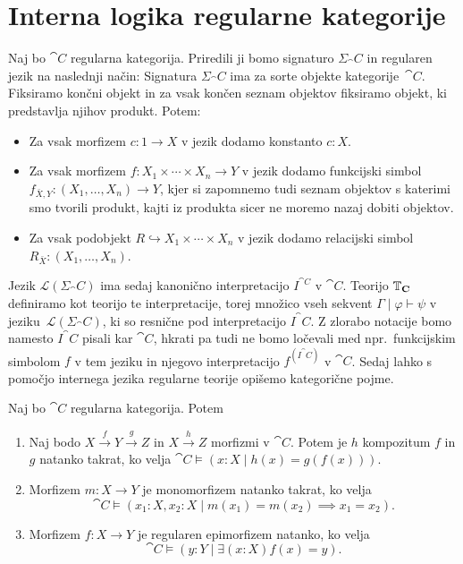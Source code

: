 \documentclass[../kategoricna_logika.tex]{subfiles}
\begin{document}
\section{Interna logika regularne kategorije}
Naj bo $\cat{C}$ regularna kategorija.  Priredili ji bomo signaturo
$\Sigma_\cat{C}$ in regularen jezik na naslednji način: Signatura
$\Sigma_\cat{C}$ ima za sorte objekte kategorije~$\cat{C}$.
Fiksiramo končni objekt in za vsak končen seznam objektov fiksiramo
objekt, ki predstavlja njihov produkt. Potem:
\begin{itemize}
\item Za vsak morfizem $c : 1 \to X$ v jezik dodamo konstanto $c:X$.
\item Za vsak morfizem $f : X_1 \times \cdots \times X_n \to Y$ v jezik dodamo funkcijski
  simbol $f_{\bar{X},Y} : (X_1, \ldots, X_n) \to Y$, kjer si zapomnemo tudi seznam objektov
  s katerimi smo tvorili produkt, kajti iz produkta sicer ne moremo nazaj dobiti objektov.
\item Za vsak podobjekt $R \hookrightarrow X_1 \times \cdots \times X_n$ v jezik dodamo
  relacijski simbol $R_{\bar{X}} : (X_1, \ldots, X_n)$.
\end{itemize}
Jezik $\mathcal{L}(\Sigma_\cat{C})$ ima sedaj kanonično interpretacijo
$I^{\cat{C}}$ v $\cat{C}$.  Teorijo $\mathbb{T}_{\operatorname{\mathbf{C}}}$ definiramo kot
teorijo te interpretacije, torej množico vseh sekvent
$\Gamma \mid \varphi \vdash \psi$ v jeziku~$\mathcal{L}(\Sigma_\cat{C})$, ki so
resnične pod interpretacijo $I^\cat{C}$. Z zlorabo notacije bomo
namesto $I^\cat{C}$ pisali kar $\cat{C}$, hkrati pa tudi ne bomo
ločevali med npr.\ funkcijskim simbolom $f$ v tem jeziku in njegovo
interpretacijo $f^{(I^\cat{C})}$ v $\cat{C}$.  Sedaj lahko s pomočjo
internega jezika regularne teorije opišemo kategorične pojme.
\begin{lema}\label{lema:morfizmi-v-interni-logiki}
  Naj bo $\cat{C}$ regularna kategorija. Potem
  \begin{enumerate}[label=(\roman*)]
  \item Naj bodo $X \xrightarrow{f} Y \xrightarrow{g} Z$ in
    $X \xrightarrow{h} Z$ morfizmi v $\cat{C}$.  Potem je $h$
    kompozitum $f$ in $g$ natanko takrat, ko velja
    ${\cat{C} \models (x:X \mid  h(x) = g(f(x)))}$.
  \item Morfizem $m : X \to Y$ je monomorfizem natanko takrat, ko
    velja
    \[\cat{C} \models (x_1:X, x_2:X \mid m(x_1) = m(x_2) \implies x_1 = x_2). \]
  \item Morfizem $f : X \to Y$ je regularen epimorfizem natanko, ko
    velja
    \[ \cat{C} \models (y:Y \mid \exists (x:X) f(x) = y). \]
  \end{enumerate}
\end{lema}
\end{document}
